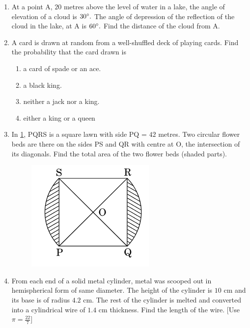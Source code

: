 \documentclass[journal,12pt,twocolumn]{IEEEtran}
\renewcommand\thesection{\arabic{section}}
\begin{document}
\begin{enumerate}[label=\thesection.\arabic*.,ref=\thesection.\theenumi]
\item At a point A, $20$ metres above the level of water in a lake, the angle of elevation of a cloud is $30 \degree.$ The angle of depression of the reflection of the cloud in the lake, at A is $60\degree .$ Find the distance of the cloud from A.
\item A card is drawn at random from a well-shuffled deck of playing cards. Find the probability that the card drawn is
 \begin{enumerate}
     \item a card of spade or an ace.
     \item a black king. 
     \item neither a jack nor a king.
     \item either a king or a queen
 \end{enumerate}
\item In \ref{Figure 5}, PQRS is a square lawn with side PQ = $42$ metres. Two circular flower beds are there on the sides PS and QR with centre at O, the intersection of its diagonals. Find the total area of the two flower beds (shaded parts).
 \begin{figure}[h!]
	\centering
    \includegraphics[width=0.8\columnwidth,center]{./figs/image5.png}
	\caption{}
	\label{Figure 5}
\end{figure}
\item From each end of a solid metal cylinder, metal was scooped out in hemispherical form of same diameter. The height of the cylinder is $10$ cm and its base is of radius $4.2$ cm. The rest of the cylinder is melted and converted into a cylindrical wire of $1.4$ cm thickness. Find the length of the wire. [Use $ \pi=\frac{22}{7} $]

\end{enumerate}
\end{document}

